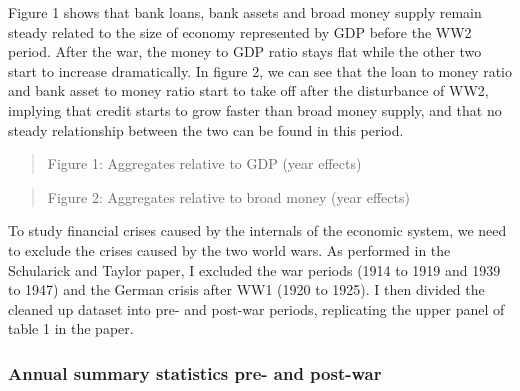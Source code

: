 \documentclass{article}
\newcommand{\ciapdf}[1]{\vspace*{-\parskip}\begin{center}\resizebox{0.75\textwidth}{!}{\texttt{[image: \#1]}}\end{center}}
\begin{document}
Figure 1 shows that bank loans, bank assets and broad money supply remain
steady related to the size of economy represented by GDP
before the WW2 period. After the war, the money to GDP ratio stays flat
while the other two start to increase dramatically. In figure 2, we
can see that the loan to money ratio and bank asset to money ratio start
to take off after the disturbance of WW2, implying that credit starts to
grow faster than broad money supply, and that no steady relationship between
the two can be found in this period.

\ciapdf{Figure_2.pdf}

\begin{quote}
Figure 1: Aggregates relative to GDP (year effects)
\end{quote}

\ciapdf{Figure_1.pdf}

\begin{quote}
Figure 2: Aggregates relative to broad money (year effects)
\end{quote}

To study financial crises caused by the internals of the economic system,
we need to
exclude the crises caused by the two world wars. As performed in the Schularick and
Taylor paper, I excluded the war periods (1914 to 1919 and 1939 to 1947)
and the German crisis after WW1 (1920 to 1925). I then divided the cleaned up
dataset into pre- and post-war periods, replicating the upper panel of
table 1 in the paper.

\subsubsection*{\centering{}Annual summary statistics pre- and post-war}
\end{document}
